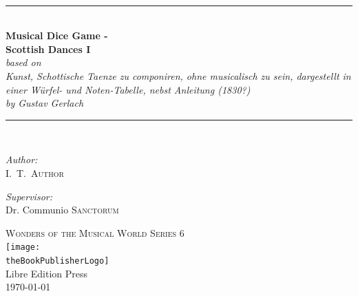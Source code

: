 \documentclass[a4paper,x11names,svgnames,10pt]{article}
\title{\textsc{\mdgBookTitle}}
\author{\textsc{\authorFirstMidNameInit \authorLastName}}
\date{\textsc{\dateGenerated}}
\def\authorFirstMidNameInit{I.\ T.\ }
\def\authorLastName{Author}
\def\dateGenerated{\today}
\def\volNumber{I}
\def\mdgBookTitle{Musical Dice Game - \\[0.15cm] Scottish Dances \volNumber}
\def\mdgBookSubTitle{{\small based on}\\ Kunst, Schottische Taenze zu componiren, ohne musicalisch zu sein, dargestellt in einer W\"{u}rfel- und Noten-Tabelle, nebst Anleitung  (1830?) \\[0.15cm] by Gustav Gerlach}
\def\theBookSeries{Wonders of the Musical World Series 6}
\def\theBookPublisher{Libre Edition Press}
\def\theBookPublisherLogo{../images/1ed.png}
\newcommand{\HRule}{\rule{\linewidth}{0.5mm}}
\begin{document}


\newpage
{
${}_{}$\\
\vspace{1.00in}	
\thispagestyle{empty}
\begin{center}
	\HRule \\[0.4cm]
	{\huge \bfseries \mdgBookTitle} \\[0.2cm]
	{\large{\em \mdgBookSubTitle} }\\[0.2cm]
	\HRule \\[1.5cm]
	\begin{minipage}{0.4\textwidth}
		\begin{flushleft} \large
			\emph{Author:}\\
			\authorFirstMidNameInit \textsc{\authorLastName}
		\end{flushleft}
	\end{minipage}
	\begin{minipage}{0.4\textwidth}
		\begin{flushright} \large
			\emph{Supervisor:} \\
			Dr. Communio \textsc{Sanctorum}
		\end{flushright}
	\end{minipage}
	\vfill
	{\textsc{\Large \theBookSeries}}  \\[0.2cm] 
	\texttt{[image: \\theBookPublisherLogo]}\\ 
	{\large \theBookPublisher \\
       \dateGenerated }\\
	\vspace{2.50in}
\end{center}
\newpage


\tableofcontents\label{tabofcon}


\baselineskip 14pt

\newpage
}
\end{document}
